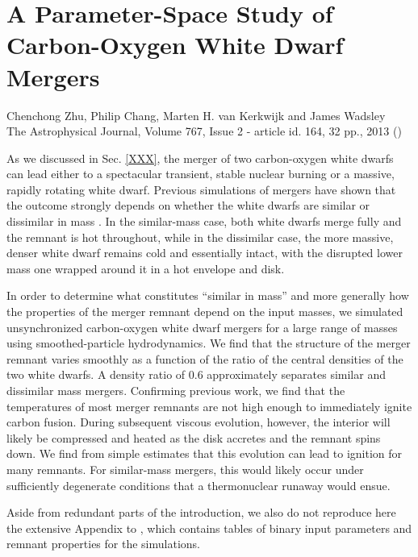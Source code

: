 \chapter{A Parameter-Space Study of Carbon-Oxygen White Dwarf Mergers}
\label{ch:ch2}

\begin{center}
\begin{minipage}[c]{4.75in}
Chenchong Zhu, Philip Chang, Marten H. van Kerkwijk and James Wadsley\\
The Astrophysical Journal, Volume 767, Issue 2 - article id. 164, 32 pp., 2013 (\citeal{zhu+13})
\vspace{2em}
\end{minipage}
\end{center}

As we discussed in Sec. \ref{XXX}, the merger of two carbon-oxygen white dwarfs can lead either to a spectacular transient, stable nuclear burning or a massive, rapidly rotating white dwarf.  Previous simulations of mergers have shown that the outcome strongly depends on whether the white dwarfs are similar or dissimilar in mass \citep{loreig09}.  In the similar-mass case, both white dwarfs merge fully and the remnant is hot throughout, while in the dissimilar case, the more massive, denser white dwarf remains cold and essentially intact, with the disrupted lower mass one wrapped around it in a hot envelope and disk.

In order to determine what constitutes ``similar in mass'' and more generally how the properties of the merger remnant depend on the input masses, we simulated unsynchronized carbon-oxygen white dwarf mergers for a large range of masses using smoothed-particle hydrodynamics.  We find that the structure of the merger remnant varies smoothly as a function of the ratio of the central densities of the two white dwarfs.  A density ratio of 0.6 approximately separates similar and dissimilar mass mergers.  Confirming previous work, we find that the temperatures of most merger remnants are not high enough to immediately ignite carbon fusion.  During subsequent viscous evolution, however, the interior will likely be compressed and heated as the disk accretes and the remnant spins down.  We find from simple estimates that this evolution can lead to ignition for many remnants.  For similar-mass mergers, this would likely occur under sufficiently degenerate conditions that a thermonuclear runaway would ensue.

Aside from redundant parts of the introduction, we also do not reproduce here the extensive Appendix to \citeal{zhu+13}, which contains tables of binary input parameters and remnant properties for the simulations.
